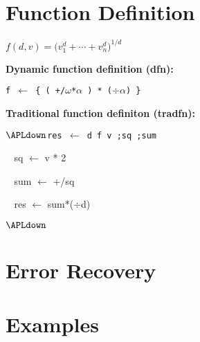 \section{Function Definition}


$f(d,v) = {\big(v_1^d+\cdots+v_n^d\big)^{1/d}}$

{\bf Dynamic function definition (dfn):}

{\tt f $\leftarrow$ \{ ( +/$\omega$*$\alpha$ ) * ($\div\alpha$)  \}}

{\bf Traditional function definiton (tradfn):}

{\tt $\APLdown$res $\leftarrow$ d f v ;sq ;sum

$\;\;$  sq $\leftarrow$ v * 2

$\;\;$  sum $\leftarrow$ +/sq

$\;\;$  res $\leftarrow$ sum*($\div$d)

$\APLdown$}

\section{Error Recovery}

\section{Examples}


\copyrightnotice

\bye


